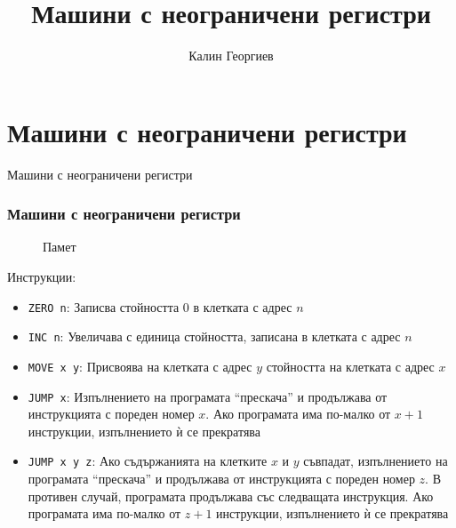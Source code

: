 \documentclass{beamer}
\begin{document}
\title[Увод в програмирането]{Машини с неограничени регистри} 
\author{Калин Георгиев} 
\frame{\titlepage} 

\section{Машини с неограничени регистри} 


\begin{frame}
\centerline{Машини с неограничени регистри}
\end{frame}


\begin{frame}[fragile]
\frametitle{Машини с неограничени регистри}
\begin{figure}
  \centering
  \caption{Памет}
  \label{fig:mnr}
\end{figure}

Инструкции:
\begin{itemize}
    \item \texttt{ZERO n}: Записва стойността 0 в клетката с адрес $n$
    \item \texttt{INC n}: Увеличава с единица стойността, записана в клетката с адрес $n$
    \item \texttt{MOVE x y}: Присвоява на клетката с адрес $y$ стойността на клетката с адрес $x$
    \item \texttt{JUMP x}: Изпълнението на програмата ``прескача'' и продължава от инструкцията с пореден номер $x$. Ако програмата има по-малко от $x+1$ инструкции, изпълнението ѝ се прекратява
    \item \texttt{JUMP x y z}: Ако съдържанията на клетките  $x$ и $y$ съвпадат, изпълнението на програмата ``прескача'' и продължава от инструкцията с пореден номер $z$. В противен случай, програмата продължава със следващата инструкция. Ако програмата има по-малко от $z+1$ инструкции, изпълнението ѝ се прекратява
\end{itemize}


\end{frame}
\end{document}
